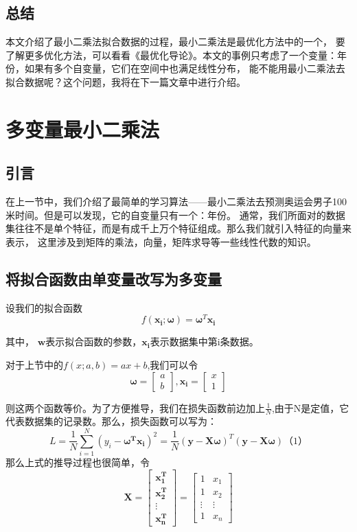 \documentclass[a4paper,12pt]{book}
\begin{document}
    \section{总结}

    本文介绍了最小二乘法拟合数据的过程，最小二乘法是最优化方法中的一个，
    要了解更多优化方法，可以看看《最优化导论》。本文的事例只考虑了一个变量：年份，如果有多个自变量，它们在空间中也满足线性分布，
    能不能用最小二乘法去拟合数据呢？这个问题，我将在下一篇文章中进行介绍。
    
    \chapter{多变量最小二乘法}

    \section{引言}
    在上一节中，我们介绍了最简单的学习算法——最小二乘法去预测奥运会男子100米时间。但是可以发现，它的自变量只有一个：年份。
    通常，我们所面对的数据集往往不是单个特征，而是有成千上万个特征组成。那么我们就引入特征的向量来表示，
    这里涉及到矩阵的乘法，向量，矩阵求导等一些线性代数的知识。

    \section{将拟合函数由单变量改写为多变量}
    设我们的拟合函数 
    $$
    f(\boldsymbol{x_i}; \boldsymbol{\omega}) = \boldsymbol{\omega}^T\boldsymbol{x_i}
    $$

    其中， $\boldsymbol{w}$表示拟合函数的参数，$\boldsymbol{x_i}$表示数据集中第i条数据。

    对于上节中的$f(x;a,b) = ax + b$,我们可以令
    $$ \boldsymbol{\omega} = \begin{bmatrix}
    a\\b
    \end{bmatrix}, 
    \boldsymbol{x_i} = \begin{bmatrix}
    x\\1
    \end{bmatrix}$$

    则这两个函数等价。为了方便推导，我们在损失函数前边加上$\frac{1}{N}$,由于N是定值，它代表数据集的记录数。那么，损失函数可以写为：
    $$
    L=\frac{1}{N}\sum_{i=1}^{N}(y_i-\boldsymbol{\omega^Tx_i})^2=\frac{1}{N}(\boldsymbol{y}-\boldsymbol{X\omega})^T(\boldsymbol{y}-\boldsymbol{X\omega}) （1）
    $$
    那么上式的推导过程也很简单，令
    $$
    \boldsymbol{X}=\begin{bmatrix}
    \boldsymbol{x_1^T} \\
    \boldsymbol{x_2^T} \\
    \vdots\\
    \boldsymbol{x_n^T}
    \end{bmatrix}
    =\begin{bmatrix}
    1 & x_1\\
    1 & x_2\\
    \vdots & \vdots\\
    1 & x_n
    \end{bmatrix}
    $$
\end{document}
